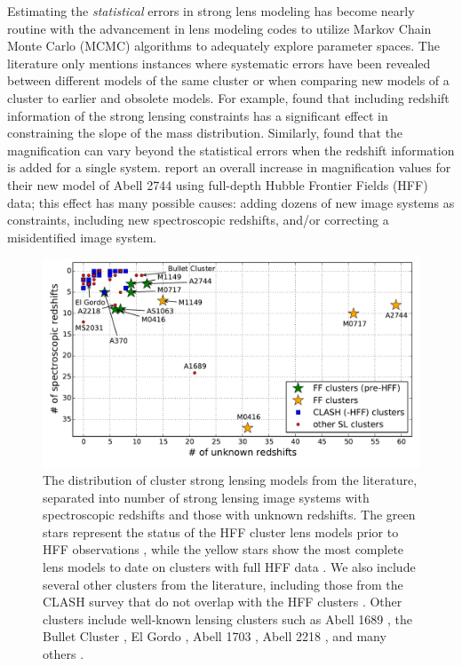 Estimating the {\it statistical} errors in strong lens modeling has become nearly routine with the advancement in lens modeling codes to utilize Markov Chain Monte Carlo (MCMC) algorithms to adequately explore parameter spaces. The literature only mentions instances where systematic errors have been revealed between different models of the same cluster or when comparing new models of a cluster to earlier and obsolete models. For example, \citet{Smith:2009lr} found that including redshift information of the strong lensing constraints has a significant effect in constraining the slope of the mass distribution. Similarly, \citet{Johnson:2014tg} found that the magnification can vary beyond the statistical errors when the redshift information is added for a single system. \citet{Jauzac:2015xy} report an overall increase in magnification values for their new model of Abell 2744 using full-depth Hubble Frontier Fields (HFF) data; this effect has many possible causes: adding dozens of new image systems as constraints, including new spectroscopic redshifts, and/or correcting a misidentified image system.

\begin{figure}
\center
\includegraphics[width=\textwidth]{Chap3/c3f1.pdf}
\caption[Strong lensing models from the literature]{The distribution of cluster strong lensing models from the literature, separated into number of strong lensing image systems with spectroscopic redshifts and those with unknown redshifts. The green stars represent the status of the HFF cluster lens models prior to HFF observations \citep{Johnson:2014tg,Richard:2014gf}, while the yellow stars show the most complete lens models to date on clusters with full HFF data \citep{Caminha:2017rw,Limousin:2016ty,Kawamata:2016nr,Treu:2016lr,Jauzac:2016dn,Jauzac:2014qd,Jauzac:2015xy}. We also include several other clusters from the literature, including those from the CLASH survey that do not overlap with the HFF clusters \citep{Zitrin:2015lq}. Other clusters include well-known lensing clusters such as Abell 1689 \citep{Diego:2015tg}, the Bullet Cluster \citep{Bradac:2009qd}, El Gordo \citep{Zitrin:2013hl}, Abell 1703 \citep{Limousin:2008lr}, Abell 2218 \citep{Eliasdottir:2007ve}, and many others \citep{Sharon:2015xe,Richard:2015lr,Richard:2010zp,Richard:2007rr,Sharon:2014fj,Bayliss:2014lr,Sharon:2012ly,Zitrin:2011qy}.}
\label{chap3:fig:slclusters}
\end{figure}

